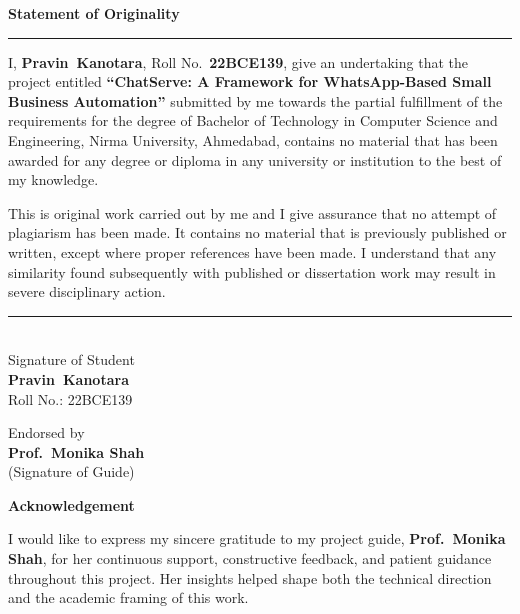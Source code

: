 \documentclass[12pt,a4paper]{report}
\newcommand{\projecttitle}{ChatServe: A Framework for WhatsApp-Based Small Business Automation}
\newcommand{\studentname}{Pravin\ Kanotara}
\newcommand{\rollno}{22BCE139}
\newcommand{\guidename}{Prof.\ Monika Shah}
\newcommand{\dept}{Computer Science and Engineering}
\newcommand{\university}{Nirma University}
\begin{document}
\newpage
\thispagestyle{empty}
\begin{center}
{\Large\textbf{Statement of Originality}}\\[0.5cm]
\hrule\vspace{1cm}
\end{center}
\begin{center}
\begin{minipage}{0.92\textwidth}
\justifying
I, \textbf{\studentname}, Roll No.\ \textbf{\rollno}, give an undertaking that the project entitled \textbf{``\projecttitle''} submitted by me towards the partial fulfillment of the requirements for the degree of Bachelor of Technology in \dept, \university, Ahmedabad, contains no material that has been awarded for any degree or diploma in any university or institution to the best of my knowledge.

This is original work carried out by me and I give assurance that no attempt of plagiarism has been made. It contains no material that is previously published or written, except where proper references have been made. I understand that any similarity found subsequently with published or dissertation work may result in severe disciplinary action.
\end{minipage}
\end{center}
\vspace{2.5cm}
\noindent\rule{5cm}{0.4pt}\\
Signature of Student\\[0.4cm]
\textbf{\studentname}\\
Roll No.: \rollno\\[0.5cm]
\vspace{2.5cm}
\begin{flushright}
Endorsed by\\[0.3cm]
\textbf{\guidename}\\
(Signature of Guide)
\end{flushright}

\newpage
{}
\begin{center}{\Large\textbf{Acknowledgement}}\end{center}

I would like to express my sincere gratitude to my project guide, \textbf{\guidename}, for her continuous support, constructive feedback, and patient guidance throughout this project. Her insights helped shape both the technical direction and the academic framing of this work.
\end{document}
